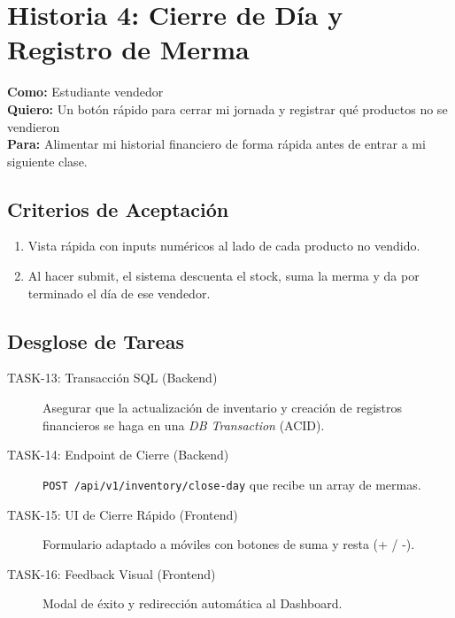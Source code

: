 \documentclass[11pt, letterpaper]{article}
\begin{document}
    \section{Historia 4: Cierre de Día y Registro de Merma}

    \begin{tcolorbox}[colback=teal!5!white,colframe=teal!75!black,title=HU-04: Cierre de Caja]
        \textbf{Como:} Estudiante vendedor \\
        \textbf{Quiero:} Un botón rápido para cerrar mi jornada y registrar qué productos no se vendieron \\
        \textbf{Para:} Alimentar mi historial financiero de forma rápida antes de entrar a mi siguiente clase.
    \end{tcolorbox}

    \subsection{Criterios de Aceptación}
    \begin{enumerate}[label=\bfseries\arabic*.]
        \item Vista rápida con inputs numéricos al lado de cada producto no vendido.
        \item Al hacer submit, el sistema descuenta el stock, suma la merma y da por terminado el día de ese vendedor.
    \end{enumerate}

    \subsection{Desglose de Tareas}
    \begin{description}
        \item[TASK-13: Transacción SQL (Backend)] Asegurar que la actualización de inventario y creación de registros financieros se haga en una \textit{DB Transaction} (ACID).
        \item[TASK-14: Endpoint de Cierre (Backend)] \texttt{POST /api/v1/inventory/close-day} que recibe un array de mermas.
        \item[TASK-15: UI de Cierre Rápido (Frontend)] Formulario adaptado a móviles con botones de suma y resta (+ / -).
        \item[TASK-16: Feedback Visual (Frontend)] Modal de éxito y redirección automática al Dashboard.
    \end{description}

    \newpage
\end{document}
